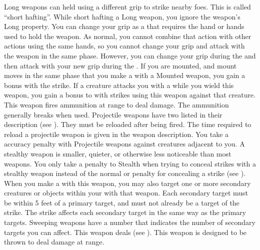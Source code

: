         Long weapons can held using a different grip to strike nearby foes.
        This is called ``short hafting''.
        While short hafting a Long weapon, you ignore the weapon's Long property.
        You can change your grip as a  that requires the hand or hands used to hold the weapon.
        As normal, you cannot combine that action with other actions using the same hands, so you cannot change your grip and attack with the weapon in the same phase.
        However, you can change your grip during the  and then attack with your new grip during the .
        \label{Mounted Weapon} If you are mounted, and mount moves in the same phase that you make a  with a Mounted weapon, you gain a   bonus with the strike.
         If a creature attacks you with a  while you wield this weapon, you  gain a  bonus to  with strikes using this weapon against that creature.
         This weapon fires ammunition at range to deal damage.
        The ammunition generally breaks when used.
        Projectile weapons have two  listed in their description (see ).
        They must be reloaded after being fired.
        The time required to reload a projectile weapon is given in the weapon description.
        You take a  accuracy penalty with Projectile weapons against creatures adjacent to you.
        A stealthy weapon is smaller, quieter, or otherwise less noticeable than most weapons.
        You only take a  penalty to Stealth when trying to conceal strikes with a stealthy weapon instead of the normal  or  penalty for concealing a strike (see ).
        \label{Sweeping} When you make a   with this weapon, you may also target one or more secondary creatures or objects within your  with that weapon.
        Each secondary target must be within 5 feet of a primary target, and must not already be a target of the strike.
        The strike affects each secondary target in the same way as the primary targets.
        Sweeping weapons have a number that indicates the number of secondary targets you can affect.
         This weapon deals  (see ).
         This weapon is designed to be thrown to deal damage at range.
